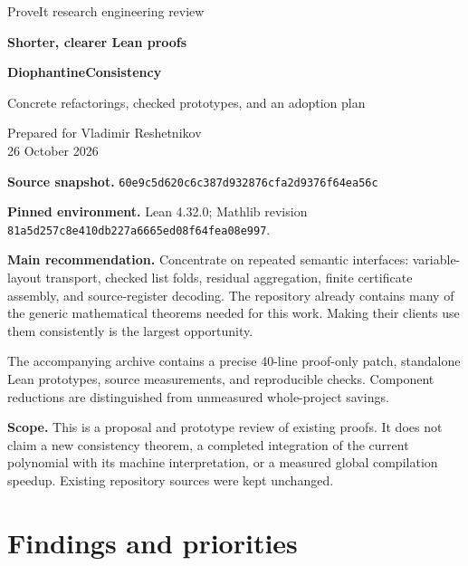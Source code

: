 \documentclass[11pt,letterpaper]{article}
\newcommand{\code}[1]{\nolinkurl{#1}}
\newcommand{\snapshot}{\code{60e9c5d620c6c387d932876cfa2d9376f64ea56c}}
\begin{document}
\begin{titlepage}
\vspace*{0.5in}
{\sffamily\color{ink}\Large ProveIt research engineering review\par}
\vspace{0.28in}
{\sffamily\bfseries\color{ink}\Huge Shorter, clearer Lean proofs\par}
\vspace{0.12in}
{\sffamily\bfseries\color{ink}\LARGE DiophantineConsistency\par}
\vspace{0.28in}
{\Large Concrete refactorings, checked prototypes, and an adoption plan\par}
\vspace{0.35in}
Prepared for Vladimir Reshetnikov\\
26 October 2026
\vspace{0.35in}

\textbf{Source snapshot.} \snapshot\par
\textbf{Pinned environment.} Lean 4.32.0; Mathlib revision
\code{81a5d257c8e410db227a6665ed08f64fea08e997}.

\vspace{0.25in}
\colorbox{pale}{\parbox{0.94\textwidth}{\vspace{7pt}
\textbf{Main recommendation.} Concentrate on repeated semantic interfaces:
variable-layout transport, checked list folds, residual aggregation,
finite certificate assembly, and source-register decoding. The repository
already contains many of the generic mathematical theorems needed for
this work. Making their clients use them consistently is the largest
opportunity.\par
\vspace{5pt}
The accompanying archive contains a precise 40-line proof-only patch,
standalone Lean prototypes, source measurements, and reproducible checks.
Component reductions are distinguished from unmeasured whole-project
savings.\vspace{7pt}}}
\vfill
\textbf{Scope.} This is a proposal and prototype review of existing proofs.
It does not claim a new consistency theorem, a completed integration of the
current polynomial with its machine interpretation, or a measured global
compilation speedup. Existing repository sources were kept unchanged.
\end{titlepage}

\tableofcontents
\newpage
\section{Findings and priorities}
\end{document}
